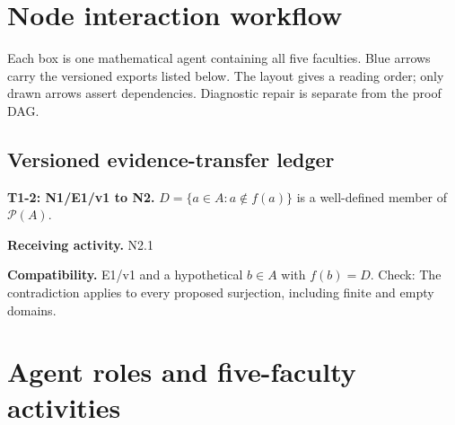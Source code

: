 \documentclass[preprint,12pt,aps,pra,showkeys,amsmath,amssymb,superscriptaddress,floatfix]{revtex4-2}
\theoremstyle{definition}
\theoremstyle{remark}
\newcommand{\field}[2]{\par\smallskip\noindent\textbf{#1.} #2\par}
\begin{document}
\clearpage\section{Node interaction workflow}

\begin{center}\end{center}

Each box is one mathematical agent containing all five faculties. Blue
arrows carry the versioned exports listed below. The layout gives a
reading order; only drawn arrows assert dependencies. Diagnostic repair
is separate from the proof DAG.

\subsection{Versioned evidence-transfer ledger}

\begingroup\small\linespread{1.05}\selectfont

\field{T1-2: N1/E1/v1 to N2}{\(D=\{a\in A:a\notin f(a)\}\) is a well-defined member of
\(\mathcal P(A)\).}

\field{Receiving activity}{N2.1}

\field{Compatibility}{E1/v1 and a hypothetical \(b\in A\) with \(f(b)=D\). Check: The
contradiction applies to every proposed surjection, including finite and
empty domains.}

\endgroup

\clearpage\section{Agent roles and five-faculty activities}\begingroup\small\linespread{1.05}\selectfont{}
\end{document}
